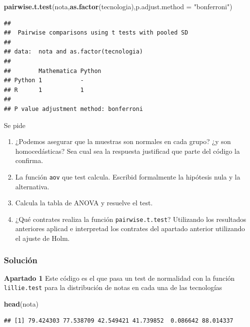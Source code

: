 \documentclass[
]{article}
\newenvironment{Shaded}{\begin{snugshade}}{\end{snugshade}}
\newcommand{\DataTypeTok}[1]{\textcolor[rgb]{0.13,0.29,0.53}{#1}}
\newcommand{\KeywordTok}[1]{\textcolor[rgb]{0.13,0.29,0.53}{\textbf{#1}}}
\newcommand{\NormalTok}[1]{#1}
\newcommand{\StringTok}[1]{\textcolor[rgb]{0.31,0.60,0.02}{#1}}
\providecommand{\tightlist}{%
  \setlength{\itemsep}{0pt}\setlength{\parskip}{0pt}}
\begin{document}
\begin{Shaded}
\begin{Highlighting}[]
\KeywordTok{pairwise.t.test}\NormalTok{(nota,}\KeywordTok{as.factor}\NormalTok{(tecnologia),}\DataTypeTok{p.adjust.method =} \StringTok{"bonferroni"}\NormalTok{)}
\end{Highlighting}
\end{Shaded}

\begin{verbatim}
## 
##  Pairwise comparisons using t tests with pooled SD 
## 
## data:  nota and as.factor(tecnologia) 
## 
##        Mathematica Python
## Python 1           -     
## R      1           1     
## 
## P value adjustment method: bonferroni
\end{verbatim}

Se pide

\begin{enumerate}
\def\labelenumi{\arabic{enumi}.}
\tightlist
\item
  ¿Podemos asegurar que la muestras son normales en cada grupo? ¿y son
  homocedásticas? Sea cual sea la respuesta justificad que parte del
  código la confirma.
\item
  La función \texttt{aov} que test calcula. Escribid formalmente la
  hipótesis nula y la alternativa.
\item
  Calcula la tabla de ANOVA y resuelve el test.
\item
  ¿Qué contrates realiza la función \texttt{pairwise.t.test}? Utilizando
  los resultados anteriores aplicad e interpretad los contrates del
  apartado anterior utilizando el ajuste de Holm.
\end{enumerate}

\hypertarget{soluciuxf3n-4}{%
\subsubsection{Solución}\label{soluciuxf3n-4}}

\textbf{Apartado 1} Este código es el que pasa un test de normalidad con
la función \texttt{lillie.test} para la distribución de notas en cada
una de las tecnologías

\begin{Shaded}
\begin{Highlighting}[]
\KeywordTok{head}\NormalTok{(nota)}
\end{Highlighting}
\end{Shaded}

\begin{verbatim}
## [1] 79.424303 77.538709 42.549421 41.739852  0.086642 88.014337
\end{verbatim}
\end{document}
